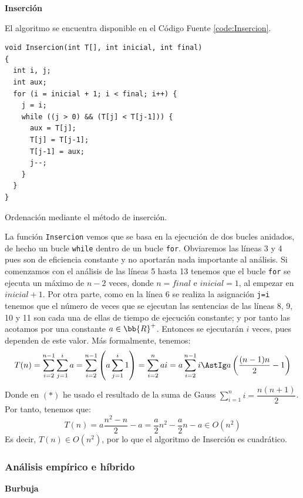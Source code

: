 \documentclass[12pt]{article}
\begin{document}
    \textbf{Inserción}

    El algoritmo se encuentra disponible en el Código Fuente \ref{code:Insercion}.
    \begin{listing}
        \begin{verbatim}
void Insercion(int T[], int inicial, int final)
{
  int i, j;
  int aux;
  for (i = inicial + 1; i < final; i++) {
    j = i;
    while ((j > 0) && (T[j] < T[j-1])) {
      aux = T[j];
      T[j] = T[j-1];
      T[j-1] = aux;
      j--;
    }
  }
}
    \end{verbatim}
    \caption{Ordenación mediante el método de inserción.}
    \label{code:Insercion}
    \end{listing}

    La función \verb|Insercion| vemos que se basa en la ejecución de dos bucles anidados, de hecho un bucle \verb|while| dentro de un bucle \verb|for|. Obviaremos las líneas 3 y 4 pues son de eficiencia constante y no aportarán nada importante al análisis. Si comenzamos con el análisis de las líneas 5 hasta 13 tenemos que el bucle \verb|for| se ejecuta un máximo de $n-2$ veces, donde $n=final$ e $inicial=1$, al empezar en $inicial+1$. Por otra parte, como en la línea 6 se realiza la asignación \verb|j=i| tenemos que el número de veces que se ejecutan las sentencias de las líneas 8, 9, 10 y 11 son cada una de ellas de tiempo de ejecución constante; y por tanto las acotamos por una constante $a\in\bb{R}^{+}$. Entonces se ejecutarán $i$ veces, pues dependen de este valor. Más formalmente, tenemos:
    $$T(n)=\sum_{i=2}^{n-1}\sum_{j=1}^{i}a=\sum_{i=2}^{n-1}\left(a\sum_{j=1}^{i}1\right)=\sum_{i=2}^{n}ai=a\sum_{i=2}^{n-1}i\AstIg a\left(\frac{(n-1)n}{2}-1\right)$$
    Donde en $(\ast)$ he usado el resultado de la suma de Gauss $\sum\limits_{i=1}^{n}i=\dfrac{n(n+1)}{2}$. Por tanto, tenemos que:
    $$T(n)=a\frac{n^2-n}{2} - a=\frac{a}{2}n^2-\frac{a}{2}n - a \in O(n^2)$$
    Es decir, $T(n)\in O(n^2)$, por lo que el algoritmo de Inserción es cuadrático.
    \subsubsection{Análisis empírico e híbrido} 
    \textbf{Burbuja}
\end{document}
